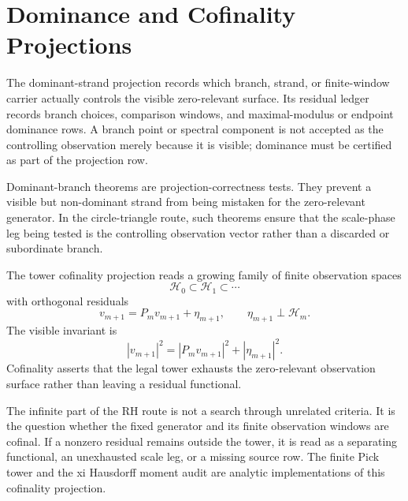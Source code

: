 \section{Dominance and Cofinality Projections}
\label{sec:rh-circle-triangle-dominance-cofinality}

\begin{definition}
\label{def:rh-dominant-strand-projection}
The dominant-strand projection records which branch, strand, or
finite-window carrier actually controls the visible zero-relevant
surface. Its residual ledger records branch choices, comparison windows,
and maximal-modulus or endpoint dominance rows. A branch point or
spectral component is not accepted as the controlling observation merely
because it is visible; dominance must be certified as part of the
projection row.
\end{definition}

\begin{principle}
\label{prin:rh-dominance-prevents-false-projection-collapse}
Dominant-branch theorems are projection-correctness tests. They prevent a
visible but non-dominant strand from being mistaken for the zero-relevant
generator. In the circle-triangle route, such theorems ensure that the
scale-phase leg being tested is the controlling observation vector rather
than a discarded or subordinate branch.
\end{principle}

\begin{definition}
\label{def:rh-tower-cofinality-projection}
The tower cofinality projection reads a growing family of finite
observation spaces
$$
\mathcal H_0\subset\mathcal H_1\subset\cdots
$$
with orthogonal residuals
$$
v_{m+1}
=
P_m v_{m+1}+\eta_{m+1},
\qquad
\eta_{m+1}\perp\mathcal H_m.
$$
The visible invariant is
$$
|v_{m+1}|^2
=
|P_m v_{m+1}|^2+|\eta_{m+1}|^2.
$$
Cofinality asserts that the legal tower exhausts the zero-relevant
observation surface rather than leaving a residual functional.
\end{definition}

\begin{principle}
\label{prin:rh-tower-cofinality-infinite-no-scale-test}
The infinite part of the RH route is not a search through unrelated
criteria. It is the question whether the fixed generator and its finite
observation windows are cofinal. If a nonzero residual remains outside
the tower, it is read as a separating functional, an unexhausted scale
leg, or a missing source row. The finite Pick tower and the xi Hausdorff
moment audit are analytic implementations of this cofinality projection.
\end{principle}


